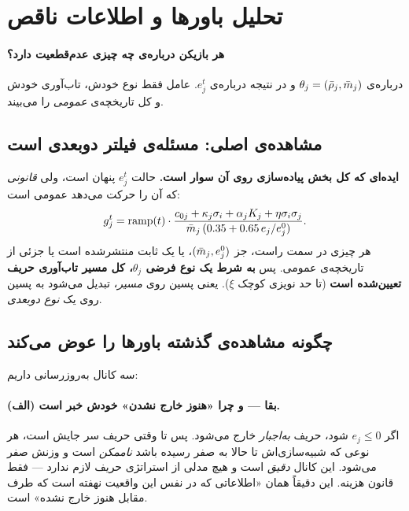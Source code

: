 \documentclass[12pt,a4paper]{article}
\begin{document}
\section{تحلیل باورها و اطلاعات ناقص}\label{sec:beliefs}

\paragraph{هر بازیکن درباره‌ی چه چیزی عدم‌قطعیت دارد؟}
درباره‌ی $\theta_j=(\bar{\rho}_j,\bar{m}_j)$ و در نتیجه درباره‌ی $e_j^t$. عامل فقط
نوع خودش، تاب‌آوری خودش و کل تاریخچه‌ی \emph{عمومی} را می‌بیند.

\subsection{مشاهده‌ی اصلی: مسئله‌ی فیلتر دوبعدی است}

\begin{keybox}
\textbf{ایده‌ای که کل بخش پیاده‌سازی روی آن سوار است.}
حالت $e_j^t$ پنهان است، ولی \emph{قانونی} که آن را حرکت می‌دهد عمومی است:
\[
  g_j^t=\mathrm{ramp}(t)\cdot
  \frac{c_{0j}+\kappa_j\sigma_i+\alpha_j K_j+\eta\sigma_i\sigma_j}
       {\bar{m}_j\,(0.35+0.65\,e_j/e_j^0)} .
\]
هر چیزی در سمت راست، جز $(\bar{m}_j,e_j^0)$، یا یک ثابت منتشرشده است یا جزئی
از تاریخچه‌ی عمومی. پس \textbf{به شرط یک نوع فرضی $\theta_j$، کل مسیر
تاب‌آوری حریف تعیین‌شده است} (تا حد نویز‌ی کوچک $\xi$).
یعنی پسین روی \emph{مسیر}، تبدیل می‌شود به پسین روی یک \emph{نوع دوبعدی}.
\end{keybox}

\subsection{چگونه مشاهده‌ی گذشته باورها را عوض می‌کند}

سه کانال به‌روزرسانی داریم:

\paragraph{(الف) بقا — و چرا «هنوز خارج نشدن» خودش خبر است.}
اگر $e_j\le0$ شود، حریف \emph{به‌اجبار} خارج می‌شود. پس تا وقتی حریف سر جایش
است، هر نوعی که شبیه‌سازی‌اش تا حالا به صفر رسیده باشد \emph{ناممکن} است و
وزنش صفر می‌شود. این کانال \emph{دقیق} است و هیچ مدلی از استراتژی حریف لازم
ندارد — فقط قانون هزینه. این دقیقاً همان «اطلاعاتی که در نفس این واقعیت
نهفته است که طرف مقابل هنوز خارج نشده» است.
\end{document}
